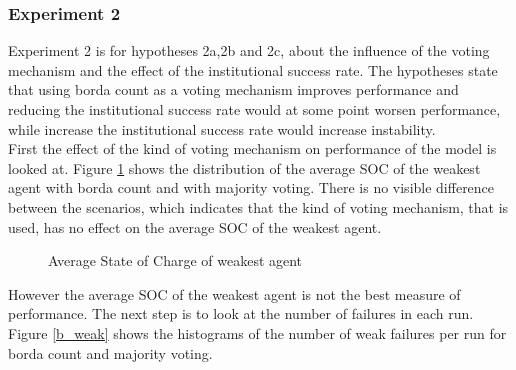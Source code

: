\documentclass[a4paper]{article}
\begin{document}
\subsubsection{Experiment 2}
Experiment 2 is for hypotheses 2a,2b and 2c, about the influence of the voting mechanism and the effect of the institutional success 
rate. The hypotheses state that using borda count as a voting mechanism improves performance and reducing the institutional success 
rate would at some point worsen performance, while increase the institutional success rate would increase instability.\\
First the effect of the kind of voting mechanism on performance of the model is looked at.
Figure \ref{b_average} shows the distribution of the average SOC of the weakest agent with borda count and with majority 
voting. There is no visible difference between the scenarios, which indicates that the kind of voting mechanism, that 
is used, has no  effect on the average SOC of the weakest agent. \\ 
\begin{figure}[!ht]
\caption{Average State of Charge of weakest agent}
\label{b_average}
\end{figure}
However the average SOC of the weakest agent is not the best measure of performance.
The next step is to look at the number of failures in each run.
Figure \ref{b_weak} shows the histograms of the number of weak failures per run for borda count and majority voting. 
\end{document}

